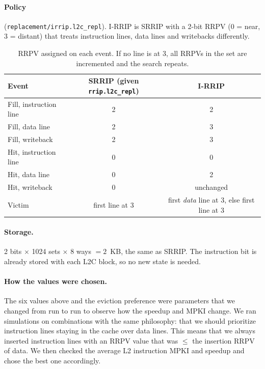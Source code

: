 \documentclass[11pt,a4paper]{article}
\begin{document}
\paragraph{Policy} (\texttt{replacement/irrip.l2c\_repl}). I-RRIP is SRRIP with a 2-bit RRPV
(0 = near, 3 = distant) that treats instruction lines, data lines and writebacks differently.

\begin{table}[H]
    \centering
    \begin{tabular}{lcc}
        \toprule
        Event & SRRIP (given \texttt{rrip.l2c\_repl}) & I-RRIP \\
        \midrule
        Fill, instruction line   & 2 & 2 \\
        Fill, data line          & 2 & 3 \\
        Fill, writeback          & 2 & 3 \\
        Hit, instruction line    & 0 & 0 \\
        Hit, data line           & 0 & 2 \\
        Hit, writeback           & 0 & unchanged \\
        Victim                   & first line at 3 & first \emph{data} line at 3, else first line at 3 \\
        \bottomrule
    \end{tabular}
    \caption{RRPV assigned on each event. If no line is at 3, all RRPVs in the set are incremented and the search repeats.}
\end{table}

\paragraph{Storage.} 2 bits $\times$ 1024 sets $\times$ 8 ways $= 2$~KB, the same as SRRIP. The
instruction bit is already stored with each L2C block, so no new state is needed.

\paragraph{How the values were chosen.} The six values above and the eviction preference were parameters that we changed from
run to run to observe how the speedup and MPKI change. We ran simulations on combinations with the same philosophy: that we should
prioritize instruction lines staying in the cache over data lines. This means that we always inserted instruction lines with an RRPV value
that was $\leq$ the insertion RRPV of data. We then checked the average L2 instruction MPKI and speedup and chose the best one accordingly.
\end{document}
